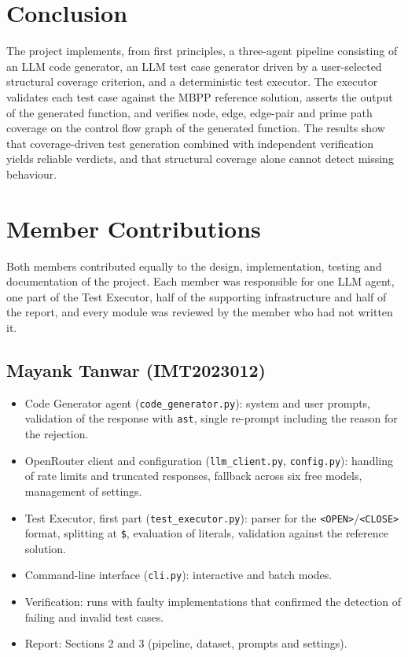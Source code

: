 \documentclass[11pt, a4paper]{article}
\begin{document}
\section{Conclusion}
\label{sec:conclusion}

The project implements, from first principles, a three-agent pipeline consisting of an LLM code generator, an LLM test case generator driven by a user-selected structural coverage criterion, and a deterministic test executor. The executor validates each test case against the MBPP reference solution, asserts the output of the generated function, and verifies node, edge, edge-pair and prime path coverage on the control flow graph of the generated function. The results show that coverage-driven test generation combined with independent verification yields reliable verdicts, and that structural coverage alone cannot detect missing behaviour.

\section{Member Contributions}
\label{sec:contrib}

Both members contributed equally to the design, implementation, testing and documentation of the project. Each member was responsible for one LLM agent, one part of the Test Executor, half of the supporting infrastructure and half of the report, and every module was reviewed by the member who had not written it.

\subsection*{Mayank Tanwar (IMT2023012)}
\begin{itemize}
    \item Code Generator agent (\texttt{code\_generator.py}): system and user prompts, validation of the response with \texttt{ast}, single re-prompt including the reason for the rejection.
    \item OpenRouter client and configuration (\texttt{llm\_client.py}, \texttt{config.py}): handling of rate limits and truncated responses, fallback across six free models, management of settings.
    \item Test Executor, first part (\texttt{test\_executor.py}): parser for the \texttt{<OPEN>}/\texttt{<CLOSE>} format, splitting at \texttt{\$}, evaluation of literals, validation against the reference solution.
    \item Command-line interface (\texttt{cli.py}): interactive and batch modes.
    \item Verification: runs with faulty implementations that confirmed the detection of failing and invalid test cases.
    \item Report: Sections 2 and 3 (pipeline, dataset, prompts and settings).
\end{itemize}
\end{document}
